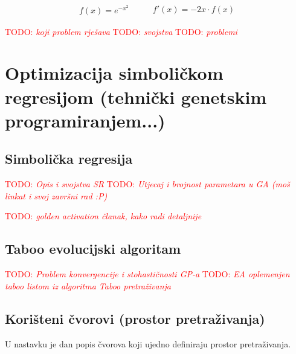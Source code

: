 \documentclass[times, utf8, diplomski]{fer}
\def\TODO#1{\noindent\textcolor{red}{TODO: \textit{#1}}\newline}
\def\todo#1{\TODO{#1}}
\begin{document}
\begin{equation}
\begin{split}
f(x) = e^{-x^2}
\end{split}
\qquad
\begin{split}
f'(x) = -2x \cdot f(x)
\end{split}
\end{equation}

\todo{koji problem rješava}
\todo{svojstva}
\todo{problemi}

\chapter{Optimizacija simboličkom regresijom (tehnički genetskim programiranjem...)}

\section{Simbolička regresija}
\todo{Opis i svojstva SR}
\todo{Utjecaj i brojnost parametara u GA (moš linkat i svoj završni rad :P)}

\todo{golden activation članak, kako radi detaljnije}

\section{Taboo evolucijski algoritam}
\todo{Problem konvergencije i stohastičnosti GP-a}
\todo{EA oplemenjen taboo listom iz algoritma Taboo pretraživanja}

\section{Korišteni čvorovi (prostor pretraživanja)}
U nastavku je dan popis čvorova koji ujedno definiraju prostor pretraživanja.
\end{document}
